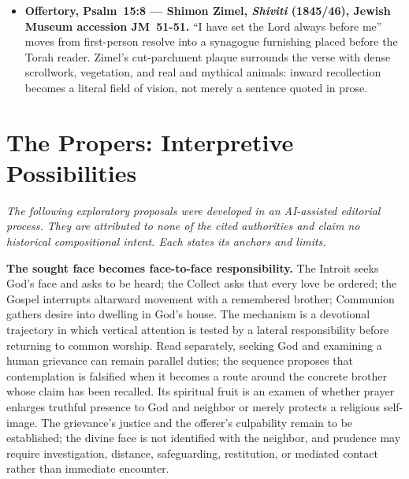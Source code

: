 \begin{deepstudy}
{\begin{itemize}[itemsep=0.35em,topsep=0.2em,parsep=0pt]
\item \textbf{Offertory, Psalm~15:8 --- Shimon Zimel, \emph{Shiviti} (1845/46), Jewish Museum accession JM~51-51.} ``I have set the Lord always before me'' moves from first-person resolve into a synagogue furnishing placed before the Torah reader. Zimel's cut-parchment plaque surrounds the verse with dense scrollwork, vegetation, and real and mythical animals: inward recollection becomes a literal field of vision, not merely a sentence quoted in prose.
\end{itemize}
}

\sectionguard
\section*{The Propers: Interpretive Possibilities}

\noindent\emph{The following exploratory proposals were developed in an AI-assisted editorial process. They are attributed to none of the cited authorities and claim no historical compositional intent. Each states its anchors and limits.}

\noindent\textbf{The sought face becomes face-to-face responsibility.\enspace{}}
The Introit seeks God's face and asks to be heard; the Collect asks that every love be ordered; the Gospel interrupts altarward movement with a remembered brother; Communion gathers desire into dwelling in God's house. The mechanism is a devotional trajectory in which vertical attention is tested by a lateral responsibility before returning to common worship. Read separately, seeking God and examining a human grievance can remain parallel duties; the sequence proposes that contemplation is falsified when it becomes a route around the concrete brother whose claim has been recalled. Its spiritual fruit is an examen of whether prayer enlarges truthful presence to God and neighbor or merely protects a religious self-image. The grievance's justice and the offerer's culpability remain to be established; the divine face is not identified with the neighbor, and prudence may require investigation, distance, safeguarding, restitution, or mediated contact rather than immediate encounter.


\end{deepstudy}
